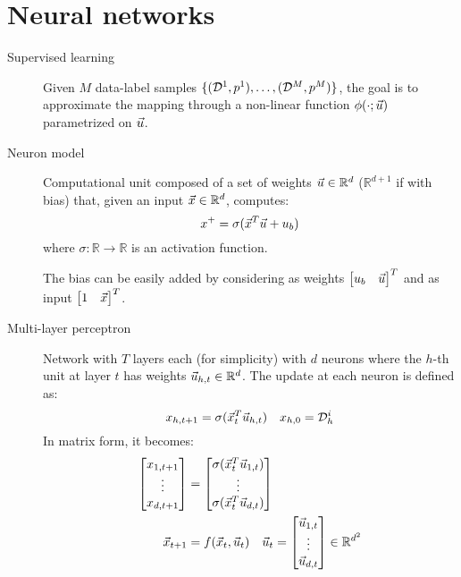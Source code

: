 \chapter{Neural networks}

\begin{description}
    \item[Supervised learning] 
        Given $M$ data-label samples $\{ (\mathcal{D}^1, p^1), \dots, (\mathcal{D}^M, p^M) \}$, the goal is to approximate the mapping through a non-linear function $\phi(\cdot; {\vec{u}})$ parametrized on ${\vec{u}}$.
\end{description}


\begin{description}
    \item[Neuron model] 
        Computational unit composed of a set of weights ${\vec{u}} \in \mathbb{R}^d$ ($\mathbb{R}^{d+1}$ if with bias) that, given an input ${\vec{x}} \in \mathbb{R}^d$, computes:
        \[
            x^{+} = \sigma({\vec{x}}^T {\vec{u}} + u_{b})
        \]
        where $\sigma: \mathbb{R} \rightarrow \mathbb{R}$ is an activation function.

        \begin{remark}
            The bias can be easily added by considering as weights $\begin{bmatrix} u_b & {\vec{u}} \end{bmatrix}^T$ and as input $\begin{bmatrix} 1 & {\vec{x}} \end{bmatrix}^T$.
        \end{remark}


    \item[Multi-layer perceptron] 
        Network with $T$ layers each (for simplicity) with $d$ neurons where the $h$-th unit at layer $t$ has weights ${\vec{u}}_{h,t} \in \mathbb{R}^d$. The update at each neuron is defined as:
        \[
            x_{h,t+1} = \sigma({\vec{x}}_t^T {\vec{u}}_{h,t})
            \quad
            x_{h,0} = \mathcal{D}^i_h
        \]
        In matrix form, it becomes:
        \[
            \begin{split}
                \begin{bmatrix}
                    x_{1, t+1} \\ \vdots \\ x_{d, t+1}
                \end{bmatrix}
                &=
                \begin{bmatrix}
                    \sigma({\vec{x}}_t^T {\vec{u}}_{1,t}) \\
                    \vdots \\
                    \sigma({\vec{x}}_t^T {\vec{u}}_{d,t})
                \end{bmatrix} \\
                {\vec{x}}_{t+1} &= f({\vec{x}}_t, {\vec{u}}_t) \quad {\vec{u}}_t = \begin{bmatrix}
                    {\vec{u}}_{1,t} \\ \vdots \\ {\vec{u}}_{d,t}
                \end{bmatrix} \in \mathbb{R}^{d^2}
            \end{split}
        \]
\end{description}
